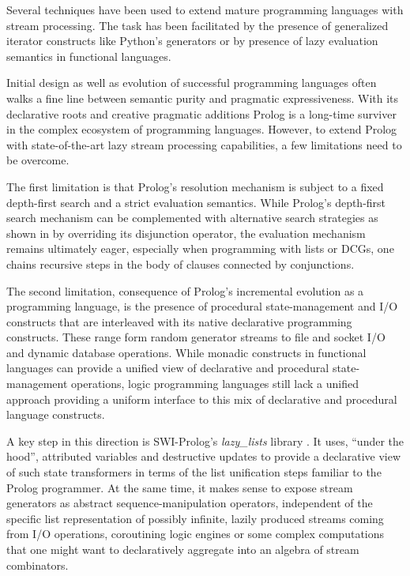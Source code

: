 \documentclass{new_tlp}
\begin{document}
Several techniques have been used to extend mature programming languages with stream processing. The task has been facilitated by the presence of generalized iterator constructs like Python's generators or by presence of lazy evaluation semantics in
functional languages.

Initial design as well as evolution of successful programming languages often walks a fine line between semantic purity and pragmatic expressiveness. With its declarative roots and creative pragmatic additions Prolog is a long-time surviver in the complex ecosystem of programming languages. However, to extend Prolog with state-of-the-art lazy stream processing capabilities, a few limitations need to be overcome.

The first limitation is that Prolog's resolution mechanism is subject to a fixed depth-first search and a strict evaluation semantics.
While Prolog's depth-first  search mechanism can be complemented with alternative search strategies as shown in \cite{tor} by overriding its disjunction operator, the evaluation mechanism remains ultimately eager, especially when programming with lists or DCGs, one chains recursive steps
in the body of clauses connected by conjunctions. 

The second limitation, consequence of Prolog's incremental evolution as a programming language, is the presence of procedural state-management and I/O constructs that are
interleaved with its native declarative programming constructs. These range form 
random generator streams to file and socket I/O and dynamic database operations.
While monadic constructs in functional languages \cite{moggi:monads,wadler93:cont}  can provide  a unified view of declarative and procedural state-management operations, logic programming languages still lack a unified approach providing a uniform interface to 
this mix of declarative and procedural language constructs.

A key step in this direction is SWI-Prolog's \cite{swi} {\em lazy\_lists} library \cite{lazy_lists}.
 It uses, ``under the hood'', attributed variables and destructive updates  to provide a declarative view of such state transformers in terms of the list unification steps familiar to the Prolog programmer. 
At the same time, it makes sense to expose stream generators as abstract sequence-manipulation operators, independent of the specific list representation of
possibly infinite, lazily produced streams coming from I/O operations, coroutining logic engines or some complex computations that one might want to declaratively aggregate into an algebra of stream combinators.
\end{document}
